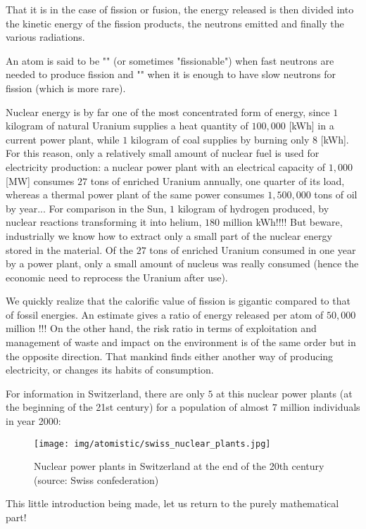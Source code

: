 	That it is in the case of fission or fusion, the energy released is then divided into the kinetic energy of the fission products, the neutrons emitted and finally the various radiations.
	\begin{tcolorbox}[title=Remark,colframe=black,arc=10pt]
	An atom is said to be "" (or sometimes "fissionable") when fast neutrons are needed to produce fission and "" when it is enough to have slow neutrons for fission (which is more rare).
	\end{tcolorbox}
	Nuclear energy is by far one of the most concentrated form of energy, since $1$ kilogram of natural Uranium supplies a heat quantity of $100,000$ [kWh] in a current power plant, while $1$ kilogram of coal supplies by burning only $8$ [kWh]. For this reason, only a relatively small amount of nuclear fuel is used for electricity production: a nuclear power plant with an electrical capacity of $1,000$ [MW] consumes $27$ tons of enriched Uranium annually, one quarter of its load, whereas a thermal power plant of the same power consumes $1,500,000$ tons of oil by year... For comparison in the Sun, $1$ kilogram of hydrogen produced, by nuclear reactions transforming it into helium, $180$ million kWh!!!! But beware, industrially we know how to extract only a small part of the nuclear energy stored in the material. Of the $27$ tons of enriched Uranium consumed in one year by a power plant, only a small amount of nucleus was really consumed (hence the economic need to reprocess the Uranium after use).

	We quickly realize that the calorific value of fission is gigantic compared to that of fossil energies. An estimate gives a ratio of energy released per atom of $50,000$ million !!! On the other hand, the risk ratio in terms of exploitation and management of waste and impact on the environment is of the same order but in the opposite direction. That mankind finds either another way of producing electricity, or changes its habits of consumption.

	For information in Switzerland, there are only $5$ at this nuclear power plants (at the beginning of the 21st century) for a population of almost $7$ million individuals in year 2000:
	 \begin{figure}[H]
		\centering
		\texttt{[image: img/atomistic/swiss\_nuclear\_plants.jpg]}
		\caption{Nuclear power plants in Switzerland at the end of the 20th century (source: Swiss confederation)}
	\end{figure}
	This little introduction being made, let us return to the purely mathematical part!


